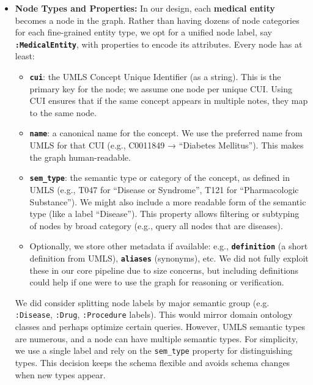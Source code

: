 \begin{itemize}
\item \textbf{Node Types and Properties:} In our design, each \textbf{medical entity} becomes a node in the graph. Rather than having dozens of node categories for each fine-grained entity type, we opt for a unified node label, say \textbf{\texttt{:MedicalEntity}}, with properties to encode its attributes. Every node has at least:

  \begin{itemize}
  \item \textbf{\texttt{cui}}: the UMLS Concept Unique Identifier (as a string). This is the primary key for the node; we assume one node per unique CUI. Using CUI ensures that if the same concept appears in multiple notes, they map to the same node.
  \item \textbf{\texttt{name}}: a canonical name for the concept. We use the preferred name from UMLS for that CUI (e.g., C0011849 → ``Diabetes Mellitus''). This makes the graph human-readable.
  \item \textbf{\texttt{sem\_type}}: the semantic type or category of the concept, as defined in UMLS (e.g., T047 for ``Disease or Syndrome'', T121 for ``Pharmacologic Substance''). We might also include a more readable form of the semantic type (like a label ``Disease''). This property allows filtering or subtyping of nodes by broad category (e.g., query all nodes that are diseases).
  \item Optionally, we store other metadata if available: e.g., \textbf{\texttt{definition}} (a short definition from UMLS), \textbf{\texttt{aliases}} (synonyms), etc. We did not fully exploit these in our core pipeline due to size concerns, but including definitions could help if one were to use the graph for reasoning or verification.
  \end{itemize}

  We did consider splitting node labels by major semantic group (e.g. \texttt{:Disease}, \texttt{:Drug}, \texttt{:Procedure} labels). This would mirror domain ontology classes and perhaps optimize certain queries. However, UMLS semantic types are numerous, and a node can have multiple semantic types. For simplicity, we use a single label and rely on the \texttt{sem\_type} property for distinguishing types. This decision keeps the schema flexible and avoids schema changes when new types appear.


\end{itemize}
